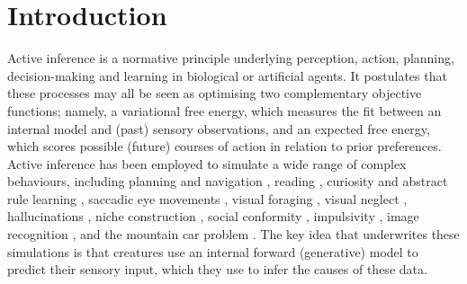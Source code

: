 \documentclass{article}
\begin{document}
\section{Introduction}
Active inference is a normative principle underlying perception, action, planning, decision-making and learning in biological or artificial agents. It postulates that these processes may all be seen as optimising two complementary objective functions; namely, a variational free energy, which measures the fit between an internal model and (past) sensory observations, and an expected free energy, which scores possible (future) courses of action in relation to prior preferences. Active inference has been employed to simulate a wide range of complex behaviours, including planning and navigation \cite{kaplanPlanningNavigationActive2018}, reading \cite{fristonDeepTemporalModels2018}, curiosity and abstract rule learning \cite{fristonActiveInferenceCuriosity2017}, saccadic eye movements \cite{parrActiveInferenceAnatomy2018}, visual foraging \cite{mirzaSceneConstructionVisual2016,parrUncertaintyEpistemicsActive2017}, visual neglect \cite{parrComputationalAnatomyVisual2018}, hallucinations \cite{adamsComputationalAnatomyPsychosis2013}, niche construction \cite{bruinebergFreeenergyMinimizationJoint2018,constantVariationalApproachNiche2018}, social conformity \cite{constantRegimesExpectationsActive2019}, impulsivity \cite{mirzaImpulsivityActiveInference2019}, image recognition \cite{millidgeImplementingPredictiveProcessing2019}, and the mountain car problem \cite{catalBayesianPolicySelection2019,fristonReinforcementLearningActive2009,fristonWhatValueAccumulated2012}. The key idea that underwrites these simulations is that creatures use an internal forward (generative) model to predict their sensory input, which they use to infer the causes of these data.
\end{document}

